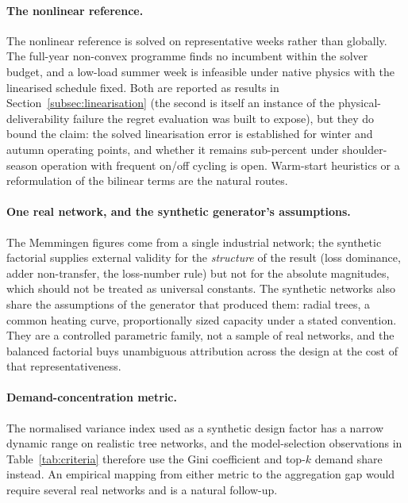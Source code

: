 \paragraph{The nonlinear reference.}
The nonlinear reference is solved on representative weeks rather than globally. The
full-year non-convex programme finds no incumbent within the solver budget, and a low-load
summer week is infeasible under native physics with the linearised schedule fixed. Both
are reported as results in Section~\ref{subsec:linearisation} (the second is itself an
instance of the physical-deliverability failure the regret evaluation was built to expose),
but they do bound the claim: the solved linearisation error is established for winter
and autumn operating points, and whether it remains sub-percent under shoulder-season
operation with frequent on/off cycling is open. Warm-start heuristics or a reformulation
of the bilinear terms are the natural routes.

\paragraph{One real network, and the synthetic generator's assumptions.}
The Memmingen figures come from a single industrial network; the synthetic factorial
supplies external validity for the \emph{structure} of the result (loss dominance,
adder non-transfer, the loss-number rule) but not for the absolute magnitudes, which
should not be treated as universal constants. The synthetic networks also share the
assumptions of the generator that produced them: radial trees, a common heating curve,
proportionally sized capacity under a stated convention. They are a controlled parametric
family, not a sample of real networks, and the balanced factorial buys unambiguous
attribution across the design at the cost of that representativeness.

\paragraph{Demand-concentration metric.}
The normalised variance index used as a synthetic design factor has a narrow dynamic range
on realistic tree networks, and the model-selection observations in
Table~\ref{tab:criteria} therefore use the Gini coefficient and top-$k$ demand share
instead. An empirical mapping from either metric to the aggregation gap would require
several real networks and is a natural follow-up.

